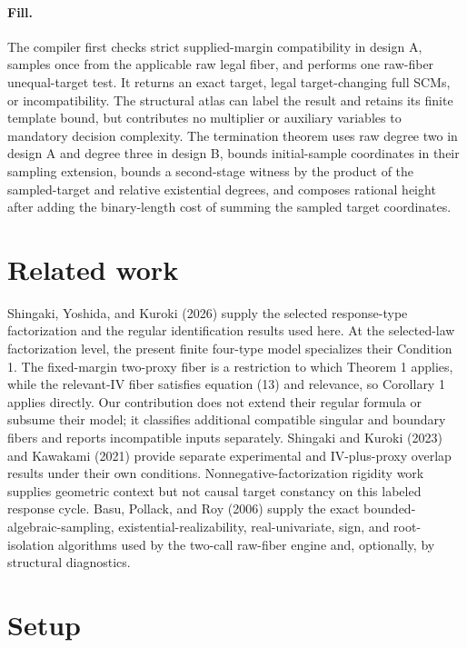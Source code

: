 \documentclass{article}
\begin{document}
\paragraph{Fill.} The compiler first checks strict supplied-margin compatibility in design A, samples once from the applicable raw legal fiber, and performs one raw-fiber unequal-target test. It returns an exact target, legal target-changing full SCMs, or incompatibility. The structural atlas can label the result and retains its finite template bound, but contributes no multiplier or auxiliary variables to mandatory decision complexity. The termination theorem uses raw degree two in design A and degree three in design B, bounds initial-sample coordinates in their sampling extension, bounds a second-stage witness by the product of the sampled-target and relative existential degrees, and composes rational height after adding the binary-length cost of summing the sampled target coordinates.

\section{Related work}

Shingaki, Yoshida, and Kuroki (2026) supply the selected response-type factorization and the regular identification results used here.  At the selected-law factorization level, the present finite four-type model specializes their Condition 1.  The fixed-margin two-proxy fiber is a restriction to which Theorem 1 applies, while the relevant-IV fiber satisfies equation (13) and relevance, so Corollary 1 applies directly.  Our contribution does not extend their regular formula or subsume their model; it classifies additional compatible singular and boundary fibers and reports incompatible inputs separately.  Shingaki and Kuroki (2023) and Kawakami (2021) provide separate experimental and IV-plus-proxy overlap results under their own conditions.  Nonnegative-factorization rigidity work supplies geometric context but not causal target constancy on this labeled response cycle.  Basu, Pollack, and Roy (2006) supply the exact bounded-algebraic-sampling, existential-realizability, real-univariate, sign, and root-isolation algorithms used by the two-call raw-fiber engine and, optionally, by structural diagnostics.

\section{Setup}
\end{document}
